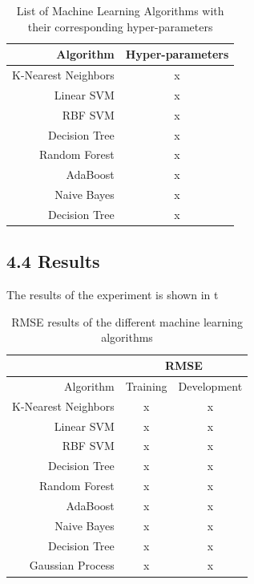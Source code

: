 \documentclass{article}
\begin{document}
 	\begin{table}
  		\begin{center}
   			\begin{tabular}{ | r | c |}
	    		\hline
			Algorithm & Hyper-parameters \\ \hline\hline
			K-Nearest Neighbors        & x \\ \hline
			Linear SVM                 & x \\ \hline
			RBF SVM                    & x \\ \hline
			Decision Tree              & x \\ \hline
			Random Forest              & x \\ \hline
			AdaBoost                   & x \\ \hline
			Naive Bayes                & x \\ \hline
			Decision Tree              & x \\ \hline
			\end{tabular}
		\end{center}
		\caption{List of Machine Learning Algorithms with their corresponding hyper-parameters}
		\label{list_mls}
	\end{table}
	
	\subsection{4.4	Results}
	The results of the experiment is shown in t
 
	\begin{table}
		\begin{center}
			\begin{tabular}{ | r | c | c |}
			\hline
			& \multicolumn{2}{c|}{RMSE} \\ \hline
			Algorithm & Training & Development \\ \hline\hline
			K-Nearest Neighbors        & x & x \\ \hline
			Linear SVM                 & x & x \\ \hline
			RBF SVM                    & x & x \\ \hline
			Decision Tree              & x & x \\ \hline
			Random Forest              & x & x \\ \hline
			AdaBoost                   & x & x \\ \hline
			Naive Bayes                & x & x \\ \hline
			Decision Tree              & x & x \\ \hline
			Gaussian Process           & x & x \\ \hline
			\end{tabular}
		\end{center}
		\caption{RMSE results of the different machine learning algorithms}
		\label{rmse_results}
	\end{table}
 
\end{document}

